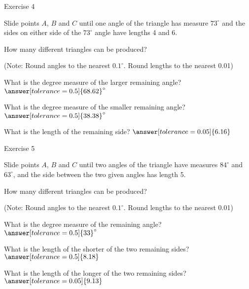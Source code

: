 \documentclass{ximera}
\begin{document}
\bigskip

Exercise 4

Slide points $A$, $B$ and $C$ until one angle of the triangle has measure $73^\circ$ and the sides on either side of the $73^\circ$ angle have lengths 4 and 6.

\begin{question}
How many different triangles can be produced?
\begin{multipleChoice}
\end{multipleChoice}
\begin{question}
(Note: Round angles to the nearest $0.1^\circ$. Round lengths to the nearest 0.01)

What is the degree measure of the larger remaining angle? $\answer[tolerance=0.5]{68.62}^\circ$

What is the degree measure of the smaller remaining angle? $\answer[tolerance=0.5]{38.38}^\circ$

What is the length of the remaining side? $\answer[tolerance=0.05]{6.16}$
\end{question}
\end{question}

Exercise 5

Slide points $A$, $B$ and $C$ until two angles of the triangle have measures $84^\circ$ and $63^\circ$, and the side between the two given angles has length 5.

\begin{question}
How many different triangles can be produced?
\begin{multipleChoice}
\end{multipleChoice}
\begin{question}
(Note: Round angles to the nearest $0.1^\circ$. Round lengths to the nearest 0.01)

What is the degree measure of the remaining angle? $\answer[tolerance=0.5]{33}^\circ$

What is the length of the shorter of the two remaining sides? $\answer[tolerance=0.5]{8.18}$

What is the length of the longer of the two remaining sides? $\answer[tolerance=0.05]{9.13}$
\end{question}
\end{question}
\end{document}
